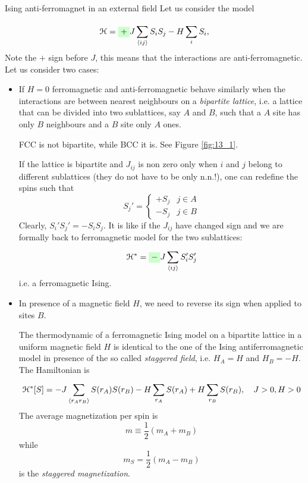 \documentclass[../main/main.tex]{subfiles}
\begin{document}
\begin{example}{Ising anti-ferromagnet in an external field}{}
Let us consider the model

\begin{equation}
  \mathcal{H} = \mathcolorbox{green!20}{+} J \sum_{\expval{ij} }^{} S_i S_j - H \sum_{i}^{} S_i,
\end{equation}
Note the \( + \) sign before \( J \), this means that the interactions are anti-ferromagnetic. Let us consider two cases:
\begin{itemize}
\item  If \( H=0 \) ferromagnetic and anti-ferromagnetic behave similarly when the interactions are between nearest neighbours on a \emph{bipartite lattice}, i.e. a lattice that can be divided into two sublattices, say \( A \) and \( B \), such that a \( A \) site has only \( B \) neighbours and a \( B \) site only \( A \) ones.
\begin{remark}
FCC is not bipartite, while BCC it is. See Figure \ref{fig:13_1}.
\end{remark}

If the lattice is bipartite and \( J_{ij} \) is non zero only when \( i \) and \( j \) belong to different sublattices (they do not have to be only n.n.!), one can redefine the spins such that
\begin{equation*}
  S_j' = \begin{cases}
    + S_j & j \in A \\
    - S_j & j \in B
\end{cases}
\end{equation*}
Clearly, \( S_i'S_j' = - S_i S_j \). It is like if the \( J_{ij} \) have changed sign and we are formally back to ferromagnetic model for the two sublattices:
\begin{equation}
  \mathcal{H}^{*} = \mathcolorbox{green!20}{-} J \sum_{\expval{ij} }^{} S_i' S_j'
\end{equation}
i.e. a ferromagnetic Ising.

\item In presence of a magnetic field \( H \), we need to reverse its sign when applied to sites \( B \).

The thermodynamic of a ferromagnetic Ising model on a bipartite lattice in a uniform magnetic field \( H \) is identical to the one of the Ising antiferromagnetic model in presence of the so called \emph{staggered field}, i.e. \( H_A = H \) and \( H_B = -H \).
The Hamiltonian is 
\begin{equation}
  \mathcal{H}^* [S] = -J \sum_{\expval{r_A r_B} }^{} S(r_A) S(r_B) - H \sum_{r_A}^{} S(r_A) + H \sum_{r_B}^{} S(r_B), \quad J>0, H>0
\end{equation}
The average magnetization per spin is
\begin{equation*}
  m \equiv \frac{1}{2}(m_A+m_B)
\end{equation*}
  while
  \begin{equation*}
    m_S = \frac{1}{2}(m_A-m_B)
  \end{equation*}
  is the \emph{staggered magnetization}.


\end{itemize}
\end{example}
\end{document}
